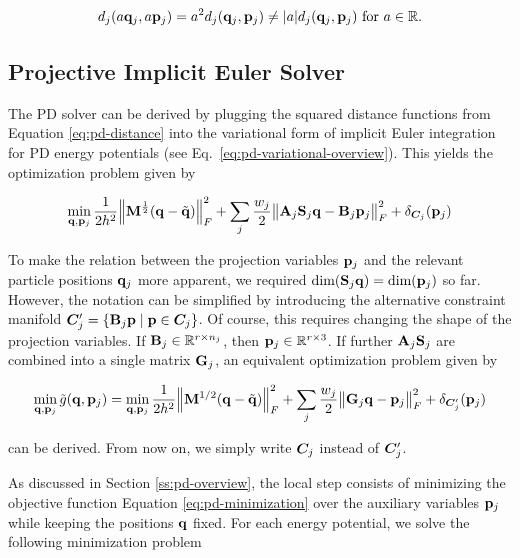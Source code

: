\[
    d_j(a\mathbf{q}_j, a\mathbf{p}_j) = a^2d_j(\mathbf{q}_j, \mathbf{p}_j) \neq \vert a \vert d_j(\mathbf{q}_j, \mathbf{p}_j) \text{ for } 
    a \in \mathbb{R}. 
\]


\subsection{Projective Implicit Euler Solver}\label{ss:pd-solver}
The PD solver can be derived by plugging the squared distance functions from Equation \ref{eq:pd-distance} into the variational 
form of implicit
Euler integration for PD energy potentials (see Eq.\ \ref{eq:pd-variational-overview}). This yields the optimization problem given by 

\begin{equation}\label{eq:pd-variational}
    \min_{\mathbf{q}, \mathbf{p}_j} \frac{1}{2h^2} \norm{\mathbf{M}^{\frac{1}{2}}(\mathbf{q} - \tilde{\mathbf{q}})}^2_F + 
    \sum_j \frac{w_j}{2} \norm{\mathbf{A}_j\mathbf{S}_j\mathbf{q} - \mathbf{B}_j\mathbf{p}_j}^2_F + \delta_{\bm{C}_j}(\mathbf{p}_j)
\end{equation}

\noindent To make the relation between the projection variables $\mathbf{p}_j$ and the relevant particle positions 
$\mathbf{q}_j$ more apparent, we required $\text{dim}(\mathbf{S}_j\mathbf{q}) = \text{dim}(\mathbf{p}_j)$ so far. However, the 
notation can be simplified by introducing the alternative constraint manifold $\bm{C}^\prime_j = \{ \mathbf{B}_j\mathbf{p} 
\mid \mathbf{p} \in \bm{C}_j \}$. Of course, this requires changing the shape of the projection variables. If 
$\mathbf{B}_j \in \mathbb{R}^{r \times n_j}$, then $\mathbf{p}_j \in \mathbb{R}^{r \times 3}$. If further $\mathbf{A}_j\mathbf{S}_j$ 
are combined into a single matrix $\mathbf{G}_j$, an equivalent optimization problem given by 

\begin{equation}\label{eq:pd-minimization}
    \min_{\mathbf{q}, \mathbf{p}_j} \tilde{g}(\mathbf{q}, \mathbf{p}_j) = 
    \min_{\mathbf{q}, \mathbf{p}_j} \frac{1}{2h^2} \norm{\mathbf{M}^{1/2}(\mathbf{q} - \tilde{\mathbf{q}})}^2_F + \sum_j \frac{w_j}{2} \norm{\mathbf{G}_j\mathbf{q}
    - \mathbf{p}_j}^2_F + \delta_{\bm{C}^\prime_j}(\mathbf{p}_j)
\end{equation}

\noindent can be derived. From now on, we simply write $\bm{C}_j$ instead of $\bm{C}^\prime_j$.

As discussed in Section \ref{ss:pd-overview}, the local step consists of minimizing the objective function 
Equation \ref{eq:pd-minimization} over the auxiliary variables $\mathbf{p}_j$ while keeping the positions $\mathbf{q}$ fixed. For each 
energy potential, we solve the following minimization problem

